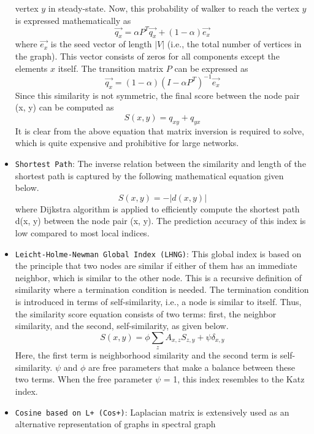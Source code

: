 \begin{itemize}
          vertex \(y\) in steady-state. Now, this probability of walker to reach
          the vertex \(y\) is expressed mathematically as
          \[\overrightarrow{q_x} = \alpha P^T \overrightarrow{q_x} + (1-\alpha) \overrightarrow{e_x}\]
          where \(\overrightarrow{e_x}\) is the seed vector of length \(|V|\)
          (i.e., the total number of vertices in the graph). This vector consists
          of zeros for all components except the elements \(x\) itself. The
          transition matrix \(P\) can be expressed as
          \[\overrightarrow{q_x} = (1-\alpha)(I - \alpha P^T)^{-1} \overrightarrow{e_x}\]
          Since this similarity is not symmetric, the final score between the node
          pair (x, y) can be computed as \[S(x, y) = q_{xy} + q_{yx}\] It is clear
          from the above equation that matrix inversion is required to solve,
          which is quite expensive and prohibitive for large networks.
    \item \texttt{Shortest\ Path}: The inverse relation between the similarity and
          length of the shortest path is captured by the following mathematical
          equation given below. \[S(x, y) = -|d(x, y)|\] where Dijkstra algorithm
          is applied to efficiently compute the shortest path d(x, y) between the
          node pair (x, y). The prediction accuracy of this index is low compared
          to most local indices.
    \item \texttt{Leicht-Holme-Newman\ Global\ Index\ (LHNG)}: This global index
          is based on the principle that two nodes are similar if either of them
          has an immediate neighbor, which is similar to the other node. This is a
          recursive definition of similarity where a termination condition is
          needed. The termination condition is introduced in terms of
          self-similarity, i.e., a node is similar to itself. Thus, the similarity
          score equation consists of two terms: first, the neighbor similarity,
          and the second, self-similarity, as given below.
          \[S(x, y) = \phi  \sum_z A_{x, z} S_{z, y} + \psi \delta_{x, y}\] Here,
          the first term is neighborhood similarity and the second term is
          self-similarity. \(\psi\) and \(\phi\) are free parameters that make a
          balance between these two terms. When the free parameter \(\psi\) = 1,
          this index resembles to the Katz index.
    \item \texttt{Cosine\ based\ on\ L+\ (Cos+)}: Laplacian matrix is extensively
          used as an alternative representation of graphs in spectral graph

\end{itemize}
